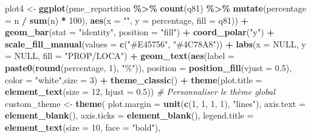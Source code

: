 \documentclass[
]{article}
\newenvironment{Shaded}{\begin{snugshade}}{\end{snugshade}}
\newcommand{\AttributeTok}[1]{\textcolor[rgb]{0.13,0.29,0.53}{#1}}
\newcommand{\CommentTok}[1]{\textcolor[rgb]{0.56,0.35,0.01}{\textit{#1}}}
\newcommand{\ConstantTok}[1]{\textcolor[rgb]{0.56,0.35,0.01}{#1}}
\newcommand{\DecValTok}[1]{\textcolor[rgb]{0.00,0.00,0.81}{#1}}
\newcommand{\FloatTok}[1]{\textcolor[rgb]{0.00,0.00,0.81}{#1}}
\newcommand{\FunctionTok}[1]{\textcolor[rgb]{0.13,0.29,0.53}{\textbf{#1}}}
\newcommand{\NormalTok}[1]{#1}
\newcommand{\OtherTok}[1]{\textcolor[rgb]{0.56,0.35,0.01}{#1}}
\newcommand{\SpecialCharTok}[1]{\textcolor[rgb]{0.81,0.36,0.00}{\textbf{#1}}}
\newcommand{\StringTok}[1]{\textcolor[rgb]{0.31,0.60,0.02}{#1}}
\begin{document}
\begin{Shaded}
\begin{Highlighting}[]
\NormalTok{plot4 }\OtherTok{\textless{}{-}} \FunctionTok{ggplot}\NormalTok{(pme\_repartition }\SpecialCharTok{\%\textgreater{}\%}
                 \FunctionTok{count}\NormalTok{(q81) }\SpecialCharTok{\%\textgreater{}\%}
                 \FunctionTok{mutate}\NormalTok{(}\AttributeTok{percentage =}\NormalTok{ n }\SpecialCharTok{/} \FunctionTok{sum}\NormalTok{(n) }\SpecialCharTok{*} \DecValTok{100}\NormalTok{), }
                \FunctionTok{aes}\NormalTok{(}\AttributeTok{x =} \StringTok{""}\NormalTok{, }\AttributeTok{y =}\NormalTok{ percentage, }\AttributeTok{fill =}\NormalTok{ q81)) }\SpecialCharTok{+}
  \FunctionTok{geom\_bar}\NormalTok{(}\AttributeTok{stat =} \StringTok{"identity"}\NormalTok{, }\AttributeTok{position =} \StringTok{"fill"}\NormalTok{) }\SpecialCharTok{+}
  \FunctionTok{coord\_polar}\NormalTok{(}\StringTok{"y"}\NormalTok{) }\SpecialCharTok{+}
  \FunctionTok{scale\_fill\_manual}\NormalTok{(}\AttributeTok{values =} \FunctionTok{c}\NormalTok{(}\StringTok{"\#E45756"}\NormalTok{, }\StringTok{"\#4C78A8"}\NormalTok{)) }\SpecialCharTok{+}
  \FunctionTok{labs}\NormalTok{(}\AttributeTok{x =} \ConstantTok{NULL}\NormalTok{, }\AttributeTok{y =} \ConstantTok{NULL}\NormalTok{, }\AttributeTok{fill =} \StringTok{"PROP/LOCA"}\NormalTok{) }\SpecialCharTok{+}
  \FunctionTok{geom\_text}\NormalTok{(}\FunctionTok{aes}\NormalTok{(}\AttributeTok{label =} \FunctionTok{paste0}\NormalTok{(}\FunctionTok{round}\NormalTok{(percentage, }\DecValTok{1}\NormalTok{), }\StringTok{"\%"}\NormalTok{)), }
            \AttributeTok{position =} \FunctionTok{position\_fill}\NormalTok{(}\AttributeTok{vjust =} \FloatTok{0.5}\NormalTok{), }\AttributeTok{color =} \StringTok{"white"}\NormalTok{,}\AttributeTok{size =} \DecValTok{3}\NormalTok{) }\SpecialCharTok{+}
  \FunctionTok{theme\_classic}\NormalTok{() }\SpecialCharTok{+}
  \FunctionTok{theme}\NormalTok{(}\AttributeTok{plot.title =} \FunctionTok{element\_text}\NormalTok{(}\AttributeTok{size =} \DecValTok{12}\NormalTok{, }\AttributeTok{hjust =} \FloatTok{0.5}\NormalTok{))}
\CommentTok{\# Personnaliser le thème global}
\NormalTok{custom\_theme }\OtherTok{\textless{}{-}} \FunctionTok{theme}\NormalTok{(}
  \AttributeTok{plot.margin =} \FunctionTok{unit}\NormalTok{(}\FunctionTok{c}\NormalTok{(}\DecValTok{1}\NormalTok{, }\DecValTok{1}\NormalTok{, }\DecValTok{1}\NormalTok{, }\DecValTok{1}\NormalTok{), }\StringTok{"lines"}\NormalTok{),}
  \AttributeTok{axis.text =} \FunctionTok{element\_blank}\NormalTok{(),}
  \AttributeTok{axis.ticks =} \FunctionTok{element\_blank}\NormalTok{(),}
  \AttributeTok{legend.title =} \FunctionTok{element\_text}\NormalTok{(}\AttributeTok{size =} \DecValTok{10}\NormalTok{, }\AttributeTok{face =} \StringTok{"bold"}\NormalTok{),}

\end{Highlighting}
\end{Shaded}
\end{document}
